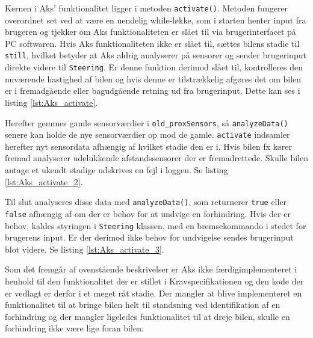 

Kernen i Aks' funktionalitet ligger i metoden \texttt{activate()}.
Metoden fungerer overordnet set ved at være en uendelig while-løkke, som i starten henter input fra brugeren og tjekker om Aks funktionaliteten er slået til via brugerinterfacet på PC softwaren.
Hvis Aks funktionaliteten ikke er slået til, sættes bilens stadie til \texttt{still}, hvilket betyder at Aks aldrig analyserer på sensorer og sender brugerinput direkte videre til \texttt{Steering}.
Er denne funktion derimod slået til, kontrolleres den nuværende hastighed af bilen og hvis denne er tilstrækkelig afgøres det om bilen er i fremadgående eller bagudgående retning ud fra brugerinput.
Dette kan ses i listing \ref{lst:Aks_activate}.



Herefter gemmes gamle sensorværdier i \texttt{old\_proxSensors}, så \texttt{analyzeData()} senere kan holde de nye sensorværdier op mod de gamle.
\texttt{activate} indsamler herefter nyt sensordata afhængig af hvilket stadie den er i.
Hvis bilen fx kører fremad analyserer udelukkende afstandssensorer der er fremadrettede.
Skulle bilen antage et ukendt stadige udskrives en fejl i loggen.
Se listing \ref{lst:Aks_activate_2}.



Til slut analyseres disse data med \texttt{analyzeData()}, som returnerer \texttt{true} eller \texttt{false} afhængig af om der er behov for at undvige en forhindring.
Hvis der er behov, kaldes styringen i \texttt{Steering} klassen, med en bremsekommando i stedet for brugerens input.
Er der derimod ikke behov for undvigelse sendes brugerinput blot videre. Se listing \ref{lst:Aks_activate_3}.



Som det fremgår af ovenstående beskrivelser er Aks ikke færdigimplementeret i henhold til den funktionalitet der er stillet i Kravspecifikationen og den kode der er vedlagt er derfor i et meget råt stadie.
Der mangler at blive implementeret en funktionalitet til at bringe bilen helt til standsning ved identifikation af en forhindring og der mangler ligeledes funktionalitet til at dreje bilen, skulle en forhindring ikke være lige foran bilen.